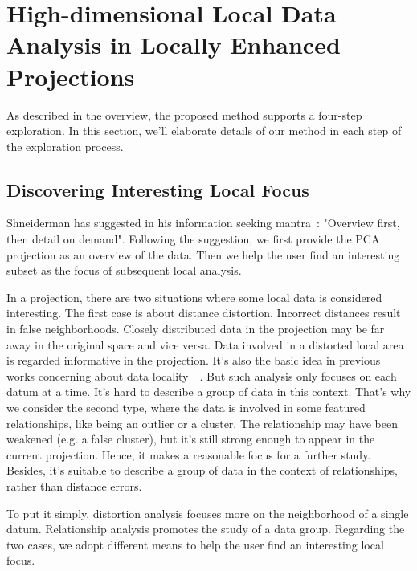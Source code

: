\section{High-dimensional Local Data Analysis in Locally Enhanced Projections}
As described in the overview, the proposed method supports a four-step exploration. In this section, we'll elaborate details of our method in each step of the exploration process.
\label{section:method}
\subsection{Discovering Interesting Local Focus}
Shneiderman has suggested in his information seeking mantra~\cite{DBLP:conf/vl/Shneiderman96}: "Overview first, then detail on demand". Following the suggestion, we first provide the PCA projection as an overview of the data. Then we help the user find an interesting subset as the focus of subsequent local analysis.

In a projection, there are two situations where some local data is considered interesting. The first case is about distance distortion. Incorrect distances result in false neighborhoods. Closely distributed data in the projection may be far away in the original space and vice versa. Data involved in a distorted local area is regarded informative in the projection. It's also the basic idea in previous works concerning about data locality~\cite{DBLP:journals/cg/MartinsCMT14}~\cite{DBLP:journals/tvcg/StahnkeDMT16}. But such analysis only focuses on each datum at a time. It's hard to describe a group of data in this context. That's why we consider the second type, where the data is involved in some featured relationships, like being an outlier or a cluster. The relationship may have been weakened (e.g. a false cluster), but it's still strong enough to appear in the current projection. Hence, it makes a reasonable focus for a further study. Besides, it's suitable to describe a group of data in the context of relationships, rather than distance errors.

To put it simply, distortion analysis focuses more on the neighborhood of a single datum. Relationship analysis promotes the study of a data group. Regarding the two cases, we adopt different means to help the user find an interesting local focus.

